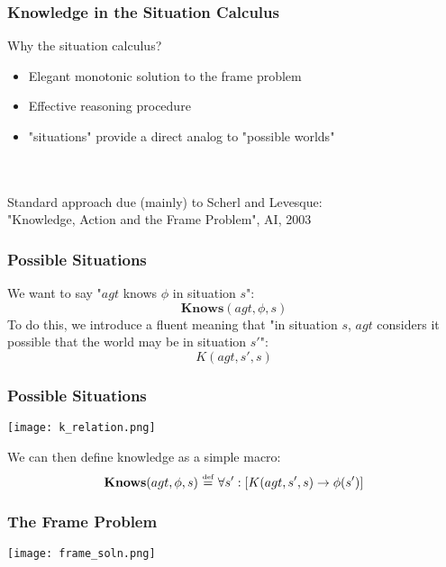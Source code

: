 \documentclass{beamer}
\newcommand{\isdef}{\hbox{$\stackrel{\mbox{\tiny def}}{=}$}}
\begin{document}
\begin{frame}
\frametitle{Knowledge in the Situation Calculus}

Why the situation calculus?
\begin{itemize}
\item Elegant monotonic solution to the frame problem
\item Effective reasoning procedure
\item "situations" provide a direct analog to "possible worlds"
\end{itemize}
\ \\
\ \\
Standard approach due (mainly) to Scherl and Levesque:\\
"Knowledge, Action and the Frame Problem", AI, 2003

\end{frame}

\begin{frame}
\frametitle{Possible Situations}
We want to say "$agt$ knows $\phi$ in situation $s$":
\begin{equation*}
\mathbf{Knows}(agt,\phi,s)
\end{equation*}
To do this, we introduce a fluent meaning that "in situation $s$, $agt$ considers it possible that the world may be in situation $s'$":
\begin{equation*}
K(agt,s',s)
\end{equation*}
\end{frame}

\begin{frame}
\frametitle{Possible Situations}
\begin{center}
  \texttt{[image: k\_relation.png]}
\end{center}

We can then define knowledge as a simple macro:
\[ \mathbf{Knows}(agt,\phi,s)\ \isdef\ \forall s':\left[K(agt,s',s)\rightarrow \phi(s')\right] \]
\end{frame}

\begin{frame}
\frametitle{The Frame Problem}
\begin{center}
  \texttt{[image: frame\_soln.png]}
\end{center}
\end{frame}
\end{document}
